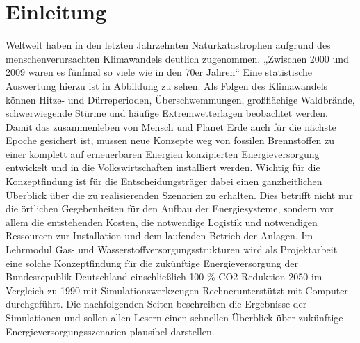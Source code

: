 \section{Einleitung}
Weltweit haben in den letzten Jahrzehnten Naturkatastrophen aufgrund des menschenverursachten Klimawandels deutlich zugenommen. „Zwischen 2000 und 2009 waren es fünfmal so viele wie in den 70er Jahren“ 
Eine statistische Auswertung hierzu ist in Abbildung  zu sehen. Als Folgen des Klimawandels können Hitze- und Dürreperioden, Überschwemmungen, großflächige Waldbrände, schwerwiegende Stürme und häufige Extremwetterlagen beobachtet werden.
Damit das zusammenleben von Mensch und Planet Erde auch für die nächste Epoche gesichert ist, müssen neue Konzepte weg von fossilen Brennstoffen zu einer komplett auf erneuerbaren Energien konzipierten Energieversorgung entwickelt und in die Volkswirtschaften installiert
werden. Wichtig für die Konzeptfindung ist für die Entscheidungsträger dabei einen ganzheitlichen Überblick über die zu realisierenden Szenarien zu erhalten. Dies betrifft nicht nur die örtlichen Gegebenheiten für den Aufbau der Energiesysteme, sondern vor allem die entstehenden Kosten, die notwendige Logistik und notwendigen Ressourcen zur Installation und dem laufenden Betrieb der Anlagen. Im Lehrmodul Gas- und Wasserstoffversorgungsstrukturen wird als Projektarbeit eine solche Konzeptfindung für die zukünftige Energieversorgung der Bundesrepublik Deutschland einschließlich 100 \% CO2 Reduktion 2050 im Vergleich zu 1990 mit Simulationswerkzeugen Rechnerunterstützt mit Computer durchgeführt. Die nachfolgenden Seiten beschreiben die Ergebnisse der Simulationen und sollen allen Lesern einen schnellen Überblick über zukünftige Energieversorgungsszenarien plausibel darstellen. 
